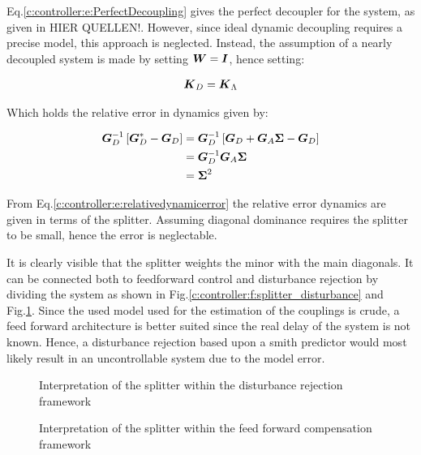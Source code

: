 Eq.\ref{c:controller:e:PerfectDecoupling} gives the perfect decoupler for the system, as given in HIER QUELLEN!. However, since ideal dynamic decoupling requires a precise model, this approach is neglected. Instead, the assumption of a nearly decoupled system is made by setting $\mbox{\boldmath$W$}=\mbox{\boldmath$I$}$, hence setting:

\begin{align}
\mbox{\boldmath$K$}_D = \mbox{\boldmath$K$}_{\Lambda}
\end{align} 

Which holds the relative error in dynamics given by:

\begin{align}
\begin{split}
\mbox{\boldmath$G$}_D^{-1}\left[\mbox{\boldmath$G$}_D^*- \mbox{\boldmath$G$}_D\right] &= \mbox{\boldmath$G$}_D^{-1}\left[\mbox{\boldmath$G$}_D + \mbox{\boldmath$G$}_A \mbox{\boldmath$\Sigma$} - \mbox{\boldmath$G$}_D \right]\\
&= \mbox{\boldmath$G$}_D^{-1}\mbox{\boldmath$G$}_A \mbox{\boldmath$\Sigma$} \\
&= \mbox{\boldmath$\Sigma$}^2
\end{split}
\label{c:controller:e:relativedynamicerror}
\end{align}

From Eq.\ref{c:controller:e:relativedynamicerror} the relative error dynamics are given in terms of the splitter. Assuming diagonal dominance requires the splitter to be small, hence the error is neglectable.

It is clearly visible that the splitter weights the minor with the main diagonals. It can be connected both to feedforward control and disturbance rejection by dividing the system as shown in Fig.\ref{c:controller:f:splitter_disturbance} and Fig.\ref{c:controller:f:splitter_feedforward}. Since the used model used for the estimation of the couplings is crude, a feed forward architecture is better suited since the real delay of the system is not known. Hence, a disturbance rejection based upon a smith predictor would most likely result in an uncontrollable system due to the model error.\\

\begin{figure}[h]
\begin{minipage}[t]{0.45\textwidth}

\caption{Interpretation of the splitter within the disturbance rejection framework}
\label{c:controller:f:splitter_disturbance}
\end{minipage}%
\hspace{0.05\textwidth}
\begin{minipage}[t]{0.45\textwidth}

\caption{Interpretation of the splitter within the feed forward compensation framework}
\label{c:controller:f:splitter_feedforward}
\end{minipage}
\end{figure}


